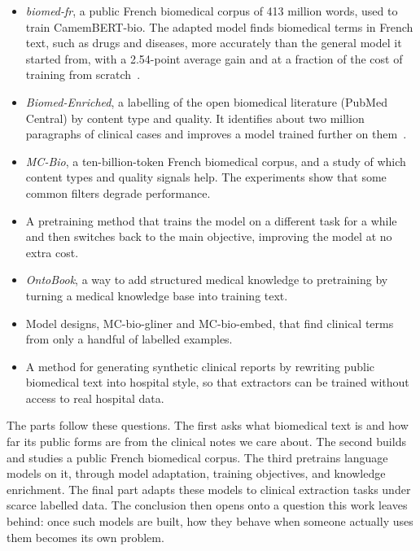 \begin{itemize}
  \item \emph{biomed-fr}, a public French biomedical corpus of 413 million words, used to train CamemBERT-bio. The adapted model finds biomedical terms in French text, such as drugs and diseases, more accurately than the general model it started from, with a 2.54-point average gain and at a fraction of the cost of training from scratch~\citep{touchent2023camembertbio}.
  \item \emph{Biomed-Enriched}, a labelling of the open biomedical literature (PubMed Central) by content type and quality. It identifies about two million paragraphs of clinical cases and improves a model trained further on them~\citep{touchent-etal-2026-biomed}.
  \item \emph{MC-Bio}, a ten-billion-token French biomedical corpus, and a study of which content types and quality signals help. The experiments show that some common filters degrade performance.
  \item A pretraining method that trains the model on a different task for a while and then switches back to the main objective, improving the model at no extra cost.
  \item \emph{OntoBook}, a way to add structured medical knowledge to pretraining by turning a medical knowledge base into training text.
  \item Model designs, MC-bio-gliner and MC-bio-embed, that find clinical terms from only a handful of labelled examples.
  \item A method for generating synthetic clinical reports by rewriting public biomedical text into hospital style, so that extractors can be trained without access to real hospital data.
\end{itemize}

\noindent The parts follow these questions. The first asks what biomedical text is and how
far its public forms are from the clinical notes we care about. The second builds
and studies a public French biomedical corpus. The third pretrains language models
on it, through model adaptation, training objectives, and knowledge enrichment. The
final part adapts these models to clinical extraction tasks under scarce labelled
data. The conclusion then opens onto a question this work leaves behind: once such
models are built, how they behave when someone actually uses them becomes its own
problem.
